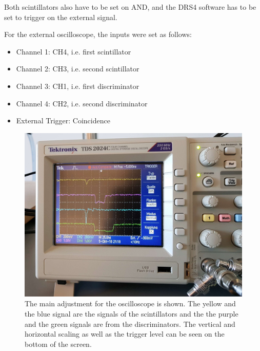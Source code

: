 \documentclass[12pt]{article}
\begin{document}
Both scintillators also have to be set on AND, and the DRS4 software has to be set to trigger on the external signal.

For the external oscilloscope, the inputs were set as follows:
\begin{itemize}
    \item Channel 1: CH4, i.e. first scintillator
    \item Channel 2: CH3, i.e. second scintillator
    \item Channel 3: CH1, i.e. first discriminator
    \item Channel 4: CH2, i.e. second discriminator
    \item External Trigger: Coincidence
\end{itemize}

\begin{figure}[H]
    \centering
    \includegraphics[width = 13cm]{pics/oscilloscope.jpg}
    \caption{\small The main adjustment for the oscilloscope is shown. The yellow and the blue signal are the signals of the scintillators and the the purple and the green signals are from the discriminators. The vertical and horizontal scaling as well as the trigger level can be seen on the bottom of the screen.}
    \label{fig:oscilloscope}
\end{figure}
\end{document}
